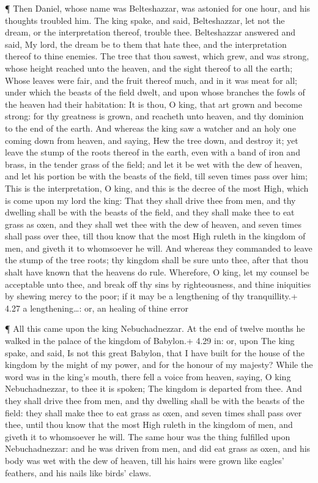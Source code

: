  ¶ Then Daniel, whose name was Belteshazzar, was astonied
for one hour, and his thoughts troubled him. The king spake, and said,
Belteshazzar, let not the dream, or the interpretation thereof, trouble
thee. Belteshazzar answered and said, My lord, the dream be to them that
hate thee, and the interpretation thereof to thine enemies.
 The tree that thou sawest, which grew, and was strong,
whose height reached unto the heaven, and the sight thereof to all the
earth;  Whose leaves were fair, and the fruit thereof much,
and in it was meat for all; under which the beasts of the field dwelt,
and upon whose branches the fowls of the heaven had their habitation:
 It is thou, O king, that art grown and become strong: for
thy greatness is grown, and reacheth unto heaven, and thy dominion to
the end of the earth.  And whereas the king saw a watcher
and an holy one coming down from heaven, and saying, Hew the tree down,
and destroy it; yet leave the stump of the roots thereof in the earth,
even with a band of iron and brass, in the tender grass of the field;
and let it be wet with the dew of heaven, and let his portion be with
the beasts of the field, till seven times pass over him; 
This is the interpretation, O king, and this is the decree of the most
High, which is come upon my lord the king:  That they shall
drive thee from men, and thy dwelling shall be with the beasts of the
field, and they shall make thee to eat grass as oxen, and they shall wet
thee with the dew of heaven, and seven times shall pass over thee, till
thou know that the most High ruleth in the kingdom of men, and giveth it
to whomsoever he will.  And whereas they commanded to leave
the stump of the tree roots; thy kingdom shall be sure unto thee, after
that thou shalt have known that the heavens do rule. 
Wherefore, O king, let my counsel be acceptable unto thee, and break off
thy sins by righteousness, and thine iniquities by shewing mercy to the
poor; if it may be a lengthening of thy tranquillity.+ 4.27 a
lengthening\ldots: or, an healing of thine error

 ¶ All this came upon the king Nebuchadnezzar.
 At the end of twelve months he walked in the palace of the
kingdom of Babylon.+ 4.29 in: or, upon  The king spake, and
said, Is not this great Babylon, that I have built for the house of the
kingdom by the might of my power, and for the honour of my majesty?
 While the word was in the king's mouth, there fell a voice
from heaven, saying, O king Nebuchadnezzar, to thee it is spoken; The
kingdom is departed from thee.  And they shall drive thee
from men, and thy dwelling shall be with the beasts of the field: they
shall make thee to eat grass as oxen, and seven times shall pass over
thee, until thou know that the most High ruleth in the kingdom of men,
and giveth it to whomsoever he will.  The same hour was the
thing fulfilled upon Nebuchadnezzar: and he was driven from men, and did
eat grass as oxen, and his body was wet with the dew of heaven, till his
hairs were grown like eagles' feathers, and his nails like birds' claws.

